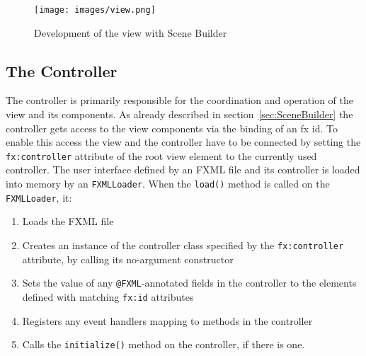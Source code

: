 
\begin{figure}[h] 
	\centering
	\texttt{[image: images/view.png]}
	\caption{Development of the view with Scene Builder}
	\label{fig:view}
\end{figure}
\subsection{The Controller}
The controller is primarily responsible for the coordination and operation of the view and its components. As already described in section~\ref{sec:SceneBuilder} the controller gets access to the view components via the binding of an fx id. To enable this access the view and the controller have to be connected by setting the \texttt{fx:controller} attribute of the root view element to the currently used controller. The user interface defined by an FXML file and its controller is loaded into memory by an \texttt{FXMLLoader}. When the \texttt{load()} method is called on the \texttt{FXMLLoader}, it:
\begin{enumerate}
\item Loads the FXML file
\item Creates an instance of the controller class specified by the \texttt{fx:controller} attribute, by calling its no-argument constructor
\item Sets the value of any \texttt{@FXML}-annotated fields in the controller to the elements defined with matching \texttt{fx:id} attributes
\item Registers any event handlers mapping to methods in the controller
\item Calls the \texttt{initialize()} method on the controller, if there is one.
\end{enumerate}

